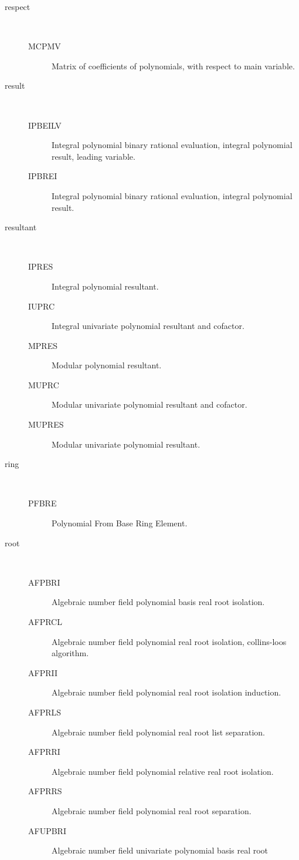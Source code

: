 \begin{description}
\item[respect] \ \ 
  \begin{description}
  \item[MCPMV]  Matrix of coefficients of polynomials, with respect to main
    variable.
  \end{description}
\item[result] \ \ 
  \begin{description}
  \item[IPBEILV]  Integral polynomial binary rational evaluation, integral
    polynomial result, leading variable.
  \item[IPBREI]  Integral polynomial binary rational evaluation, integral
    polynomial result.
  \end{description}
\item[resultant] \ \ 
  \begin{description}
  \item[IPRES]  Integral polynomial resultant.
  \item[IUPRC]  Integral univariate polynomial resultant and cofactor.
  \item[MPRES]  Modular polynomial resultant.
  \item[MUPRC]  Modular univariate polynomial resultant and cofactor.
  \item[MUPRES]  Modular univariate polynomial resultant.
  \end{description}
\item[ring] \ \ 
  \begin{description}
  \item[PFBRE]  Polynomial From Base Ring Element.
  \end{description}
\item[root] \ \ 
  \begin{description}
  \item[AFPBRI]  Algebraic number field polynomial basis real root isolation.
  \item[AFPRCL]  Algebraic number field polynomial real root isolation,
    collins-loos algorithm.
  \item[AFPRII]  Algebraic number field polynomial real root isolation
    induction.
  \item[AFPRLS]  Algebraic number field polynomial real root list separation.
  \item[AFPRRI]  Algebraic number field polynomial relative real root
    isolation.
  \item[AFPRRS]  Algebraic number field polynomial real root separation.
  \item[AFUPBRI]  Algebraic number field univariate polynomial basis real root

\end{description}
\end{description}
